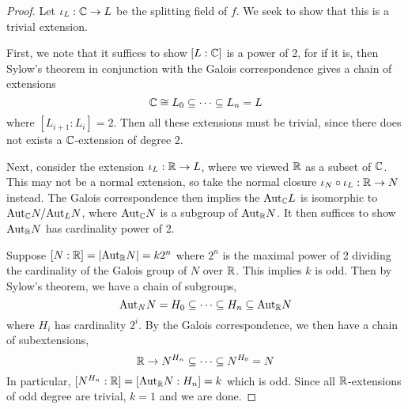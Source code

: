 \documentclass[../book.tex]{subfiles}
\begin{document}
\begin{proof}
    
    Let $\iota_L : \mathbb{C} \to L$ be the splitting field of $f$. 
    We seek to show that this is a trivial extension.
    
    First, we note that it suffices to show $[L : \mathbb{C}]$ is a power of 2,
    for if it is, then Sylow's theorem in conjunction with the Galois correspondence
    gives a chain of extensions \[
        \mathbb{C} \cong L_0 \subseteq \cdots \subseteq L_n = L
    \]
    where $[L_{i+1} : L_i] = 2$.
    Then all these extensions must be trivial, 
    since there does not exists a $\mathbb{C}$-extension of degree 2. 
    
    Next, consider the extension $\iota_L : \mathbb{R} \to L$,
    where we viewed $\mathbb{R}$ as a subset of $\mathbb{C}$. 
    This may not be a normal extension, 
    so take the normal closure $\iota_N \circ \iota_L : \mathbb{R} \to N$ instead.
    The Galois correspondence then implies 
    the $\mathrm{Aut}_{\mathbb{C}}L$ is isomorphic to $\mathrm{Aut}_{\mathbb{C}}N / \mathrm{Aut}_{L}N$,
    where $\mathrm{Aut}_{\mathbb{C}}N$ is a subgroup of $\mathrm{Aut}_{\mathbb{R}}N$.
    It then suffices to show $\mathrm{Aut}_{\mathbb{R}}N$ has cardinality power of 2. 
    
    Suppose $[N : \mathbb{R}] = |\mathrm{Aut}_{\mathbb{R}}N| = k 2^n$ where 
    $2^n$ is the maximal power of 2 
    dividing the cardinality of the Galois group of $N$ over $\mathbb{R}$.
    This implies $k$ is odd.
    Then by Sylow's theorem, we have a chain of subgroups, \[
         \mathrm{Aut}_{N}N = H_0 \subseteq \cdots \subseteq H_n \subseteq \mathrm{Aut}_{\mathbb{R}}N
    \]
    where $H_i$ has cardinality $2^i$.
    By the Galois correspondence, we then have a chain of subextensions, \[
        \mathbb{R} \to N^{H_n} \subseteq \cdots \subseteq N^{H_0} = N
    \]
    In particular, $[N^{H_n} : \mathbb{R}] = [\mathrm{Aut}_{\mathbb{R}}N : H_n] = k$ which is odd.
    Since all $\mathbb{R}$-extensions of odd degree are trivial, 
    $k = 1$ and we are done. 
    
\end{proof}
\end{document}
